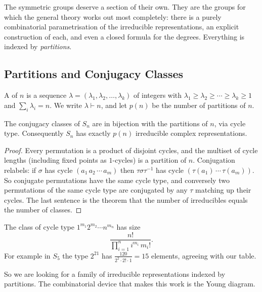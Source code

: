 The symmetric groups deserve a section of their own. They are the groups for which the general theory works out most completely: there is a purely combinatorial parametrisation of the irreducible representations, an explicit construction of each, and even a closed formula for the degrees. Everything is indexed by \emph{partitions}.

\subsection{Partitions and Conjugacy Classes}

\begin{definition}[Partition]
	A  of $n$ is a sequence $\lambda = (\lambda_1,\lambda_2,\dots,\lambda_k)$ of integers with $\lambda_1\geq\lambda_2\geq\cdots\geq\lambda_k\geq 1$ and $\sum_i\lambda_i = n$. We write $\lambda\vdash n$, and let $p(n)$ be the number of partitions of $n$.
\end{definition}

\begin{proposition}
	The conjugacy classes of $S_n$ are in bijection with the partitions of $n$, via cycle type. Consequently $S_n$ has exactly $p(n)$ irreducible complex representations.
\end{proposition}
\begin{proof}
	Every permutation is a product of disjoint cycles, and the multiset of cycle lengths (including fixed points as $1$-cycles) is a partition of $n$. Conjugation relabels: if $\sigma$ has cycle $(a_1\,a_2\,\cdots\,a_m)$ then $\tau\sigma\tau^{-1}$ has cycle $(\tau(a_1)\,\cdots\,\tau(a_m))$. So conjugate permutations have the same cycle type, and conversely two permutations of the same cycle type are conjugated by any $\tau$ matching up their cycles. The last sentence is the theorem that the number of irreducibles equals the number of classes.
\end{proof}

\begin{remark}
	The class of cycle type $1^{m_1}2^{m_2}\cdots n^{m_n}$ has size
	$$\frac{n!}{\prod_{i=1}^n i^{m_i}\,m_i!}.$$
	For example in $S_5$ the type $2^21$ has $\frac{120}{2^2\cdot2!\cdot1} = 15$ elements, agreeing with our table.
\end{remark}

So we are looking for a family of irreducible representations indexed by partitions. The combinatorial device that makes this work is the Young diagram.


